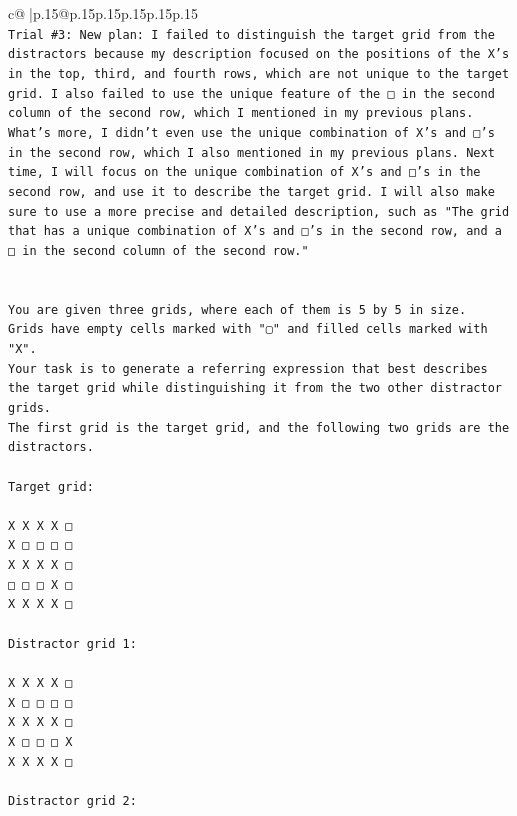 \documentclass{article}
\begin{document}
{\begin{supertabular}{c@{$\;$}|p{.15\linewidth}@{}p{.15\linewidth}p{.15\linewidth}p{.15\linewidth}p{.15\linewidth}p{.15\linewidth}}
{{{\\ 
\texttt{Trial \#3: New plan: I failed to distinguish the target grid from the distractors because my description focused on the positions of the X's in the top, third, and fourth rows, which are not unique to the target grid. I also failed to use the unique feature of the □ in the second column of the second row, which I mentioned in my previous plans. What's more, I didn't even use the unique combination of X's and □'s in the second row, which I also mentioned in my previous plans. Next time, I will focus on the unique combination of X's and □'s in the second row, and use it to describe the target grid. I will also make sure to use a more precise and detailed description, such as "The grid that has a unique combination of X's and □'s in the second row, and a □ in the second column of the second row."} \\
\\ 
\\ 
\texttt{You are given three grids, where each of them is 5 by 5 in size.} \\
\texttt{Grids have empty cells marked with "▢" and filled cells marked with "X".} \\
\texttt{Your task is to generate a referring expression that best describes the target grid while distinguishing it from the two other distractor grids.} \\
\texttt{The first grid is the target grid, and the following two grids are the distractors.} \\
\\ 
\texttt{Target grid:} \\
\\ 
\texttt{X X X X □} \\
\texttt{X □ □ □ □} \\
\texttt{X X X X □} \\
\texttt{□ □ □ X □} \\
\texttt{X X X X □} \\
\\ 
\texttt{Distractor grid 1:} \\
\\ 
\texttt{X X X X □} \\
\texttt{X □ □ □ □} \\
\texttt{X X X X □} \\
\texttt{X □ □ □ X} \\
\texttt{X X X X □} \\
\\ 
\texttt{Distractor grid 2:} \\
}}}
\end{supertabular}}
\end{document}
